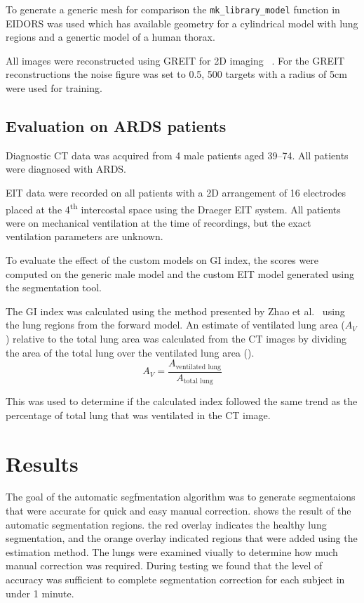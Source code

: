 To generate a generic mesh for comparison the \verb!mk_library_model! function in 
EIDORS was used which has available geometry for a cylindrical model with lung regions
and a genertic model of a human thorax.

All images were reconstructed using GREIT for 2D
imaging ~\parencite{adler_greit_2009}. For the GREIT 
reconstructions the noise figure was set to 0.5, 
500 targets with a radius of 5cm were used for training.

\subsection{Evaluation on ARDS patients} \label{sec:gi-scores}

Diagnostic CT data was acquired from 4 male patients aged 39--74. 
All patients were diagnosed with ARDS.

EIT data were recorded on all patients
with a 2D arrangement of 16 electrodes placed at the 
4\textsuperscript{th} intercostal space using the 
Draeger EIT system. 
All patients were on mechanical ventilation
at the time of recordings, but the exact 
ventilation parameters are unknown.

To evaluate the effect of the custom models on GI index, 
the scores were computed on 
the generic male model and the custom EIT model generated 
using the segmentation tool.

The GI index was calculated using the method
presented by Zhao et al.~\cite{zhao_evaluation_2009} 
using the lung regions from the 
forward model. 
An estimate of ventilated lung area ($A_V$) relative to the 
total lung area was calculated from the CT images  
by dividing the area of the total lung over the ventilated
lung area 
().
\begin{equation}\label{eq:ventilated_lung_est}
	A_V = \frac{A_{\text{ventilated lung}}}{A_{\text{total lung}}}
\end{equation}

This was used to determine if the calculated index
followed the same trend as the percentage of total lung
that was ventilated in the CT image.

\section{Results}

The goal of the automatic segfmentation algorithm was to 
generate segmentaions that were accurate for quick 
and easy manual correction. 
shows the result of the automatic segmentation regions.
the red overlay indicates the healthy lung segmentation,
and the orange overlay indicated regions that were added
using the estimation method. 
The lungs were examined viually to determine 
how much manual correction was required. During testing
we found that the level of accuracy was sufficient to 
complete segmentation correction for each subject in 
under 1 minute.

